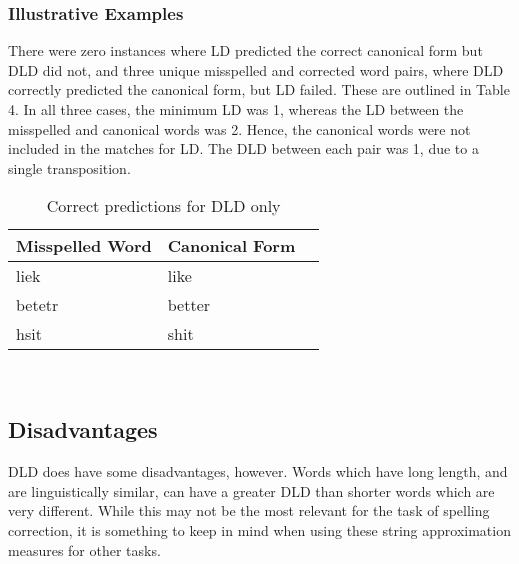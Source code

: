 \documentclass[11pt]{article}
\begin{document}
\subsubsection{Illustrative Examples}
There were zero instances where LD predicted the correct canonical form but DLD did not, and three unique misspelled and corrected word pairs, where DLD correctly predicted the canonical form, but LD failed. These are outlined in Table 4. In all three cases, the minimum LD was 1, whereas the LD between the misspelled and canonical words was 2. Hence, the canonical words were not included in the matches for LD. The DLD between each pair was 1, due to a single transposition.
\begin{table}
\begin{center}
\begin{tabular}{ |l|l|l| }
\hline
Misspelled Word & Canonical Form \\
\hline
liek & like\\
betetr & better\\ 
hsit & shit\\
\hline
\end{tabular}
\caption{Correct predictions for DLD only}\label{table4}
\end{center}
\end{table}
\\



\subsection{Disadvantages}
DLD does have some disadvantages, however. Words which have long length, and are linguistically similar, can have a greater DLD than shorter words which are very different. While this may not be the most relevant for the task of spelling correction, it is something to keep in mind when using these string approximation measures for other tasks.
\end{document}
